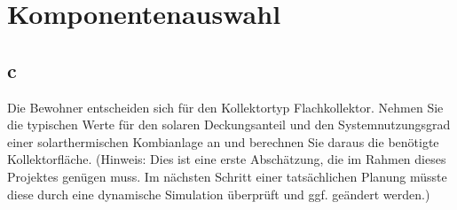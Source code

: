 \section{Komponentenauswahl}
\label{sec:Komponentenauswahl}
\subsection{c}
Die Bewohner entscheiden sich für den Kollektortyp Flachkollektor. Nehmen Sie die typischen Werte für
den solaren Deckungsanteil und den Systemnutzungsgrad einer solarthermischen Kombianlage an und
berechnen Sie daraus die benötigte Kollektorfläche.
(Hinweis: Dies ist eine erste Abschätzung, die im Rahmen dieses Projektes genügen muss. Im nächsten
Schritt einer tatsächlichen Planung müsste diese durch eine dynamische Simulation überprüft und ggf.
geändert werden.)